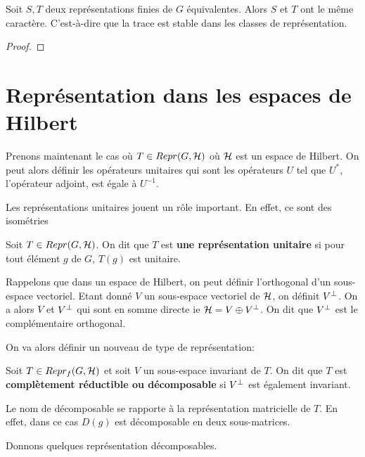 \begin{proposition}
	Soit $S, T$ deux représentations finies de $G$ équivalentes. Alors $S$ et
	$T$ ont le même caractère. C'est-à-dire que la trace est stable dans les
	classes de représentation.
\end{proposition}

\begin{proof}

\end{proof}


\section{Représentation dans les espaces de Hilbert}

Prenons maintenant le cas où $T \in Repr(G, \mathcal{H})$ où $\mathcal{H}$ est un
espace de Hilbert.
On peut alors définir les opérateurs unitaires qui sont les opérateurs $U$ tel
que $U^{*}$, l'opérateur adjoint, est égale à $U^{-1}$.

Les représentations unitaires jouent un rôle important. En effet, ce sont des
isométries

\begin{definition}
	Soit $T \in Repr(G, \mathcal{H})$. On dit que $T$ est \textbf{une
	représentation unitaire} si pour tout élément $g$ de $G$, $T(g)$ est unitaire.
\end{definition}

Rappelons que dans un espace de Hilbert, on peut définir l'orthogonal d'un
sous-espace vectoriel. Etant donné $V$ un sous-espace vectoriel de $\mathcal{H}$,
on définit $V^{\perp}$. On a alors $V$ et $V^{\perp}$ qui sont en somme
directe ie $\mathcal{H} = V \oplus V^{\perp}$. On dit que $V^{\perp}$ est le
complémentaire orthogonal.

On va alors définir un nouveau de type de représentation:


\begin{definition}
	Soit $T \in Repr_{f}(G, \mathcal{H})$ et soit $V$ un sous-espace invariant de
	$T$.
	On dit que $T$ est \textbf{complètement réductible ou décomposable} si
	$V^{\perp}$ est également invariant.
\end{definition}

Le nom de décomposable se rapporte à la représentation matricielle de $T$. En
effet, dans ce cas $D(g)$ est décomposable en deux sous-matrices.


Donnons quelques représentation décomposables.

